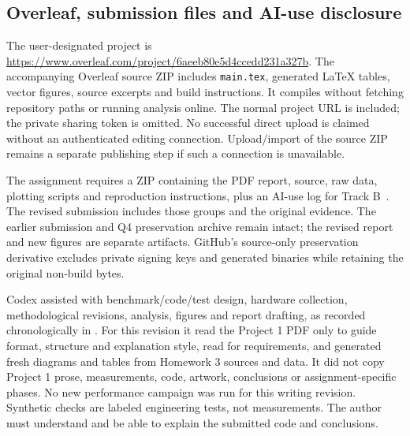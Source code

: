 \documentclass[11pt,letterpaper]{article}
\newcommand{\artifact}[1]{\path{#1}}
\begin{document}
\subsection{Overleaf, submission files and AI-use disclosure}
The user-designated project is
\url{https://www.overleaf.com/project/6aeeb80e5d4ccedd231a327b}.
The accompanying Overleaf source ZIP includes \texttt{main.tex}, generated
LaTeX tables, vector figures, source excerpts and build instructions. It
compiles without fetching repository paths or running analysis online.
The normal project URL is included; the private sharing token is omitted.
No successful direct upload is claimed without an authenticated editing
connection. Upload/import of the source ZIP remains a separate publishing
step if such a connection is unavailable.

The assignment requires a ZIP containing the PDF report, source, raw data,
plotting scripts and reproduction instructions, plus an AI-use log for
Track B~\cite{assignment}. The revised submission includes those groups and
the original evidence. The earlier submission and Q4 preservation archive
remain intact; the revised report and new figures are separate artifacts.
GitHub's source-only preservation derivative excludes private signing keys
and generated binaries while retaining the original non-build bytes.

Codex assisted with benchmark/code/test design, hardware collection,
methodological revisions, analysis, figures and report drafting, as recorded
chronologically in \artifact{AI_USE_LOG.md}. For this revision it read the
Project 1 PDF only to guide format, structure and explanation style, read
\artifact{Homework_3.pdf} for requirements, and generated fresh diagrams and
tables from Homework 3 sources and data. It did not copy Project 1 prose,
measurements, code, artwork, conclusions or assignment-specific phases.
No new performance campaign was run for this writing revision. Synthetic
checks are labeled engineering tests, not measurements. The author must
understand and be able to explain the submitted code and conclusions.
\end{document}
